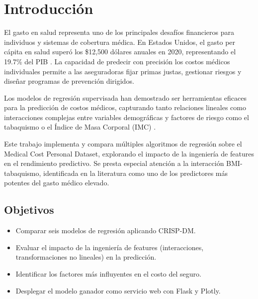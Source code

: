 \section{Introducción}

El gasto en salud representa uno de los principales desafíos financieros
para individuos y sistemas de cobertura médica. En Estados Unidos, el gasto
per cápita en salud superó los \$12,500 dólares anuales en 2020,
representando el 19.7\% del PIB \cite{cms2022national}. La capacidad de
predecir con precisión los costos médicos individuales permite a las
aseguradoras fijar primas justas, gestionar riesgos y diseñar programas
de prevención dirigidos.

Los modelos de regresión supervisada han demostrado ser herramientas
eficaces para la predicción de costos médicos, capturando tanto relaciones
lineales como interacciones complejas entre variables demográficas y
factores de riesgo como el tabaquismo o el Índice de Masa Corporal
(IMC) \cite{duan2021prediction}.

Este trabajo implementa y compara múltiples algoritmos de regresión sobre
el Medical Cost Personal Dataset, explorando el impacto de la ingeniería
de features en el rendimiento predictivo. Se presta especial atención a la
interacción BMI-tabaquismo, identificada en la literatura como uno de los
predictores más potentes del gasto médico elevado.

\subsection{Objetivos}
\begin{itemize}
  \item Comparar seis modelos de regresión aplicando CRISP-DM.
  \item Evaluar el impacto de la ingeniería de features (interacciones,
        transformaciones no lineales) en la predicción.
  \item Identificar los factores más influyentes en el costo del seguro.
  \item Desplegar el modelo ganador como servicio web con Flask y Plotly.
\end{itemize}
